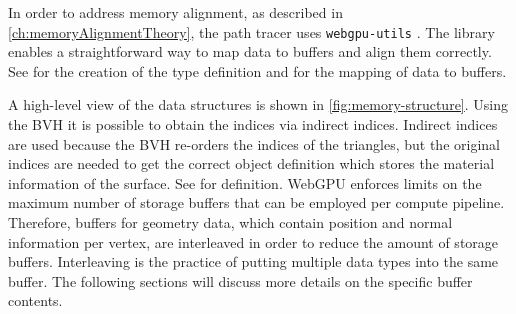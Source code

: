 In order to address memory alignment, as described in \autoref{ch:memoryAlignmentTheory}, the path tracer uses \texttt{webgpu-utils} \cite{webgpuUtilsLib}. The library enables a straightforward way to map data to buffers and align them correctly. See  for the creation of the type definition and  for the mapping of data to buffers.

A high-level view of the data structures is shown in \autoref{fig:memory-structure}. Using the \gls{BVH} it is possible to obtain the indices via indirect indices. Indirect indices are used because the \gls{BVH} re-orders the indices of the triangles, but the original indices are needed to get the correct object definition which stores the material information of the surface. See  for definition. \gls{WebGPU} enforces limits on the maximum number of storage buffers that can be employed per compute pipeline. Therefore, buffers for geometry data, which contain position and normal information per vertex, are interleaved in order to reduce the amount of storage buffers. Interleaving is the practice of putting multiple data types into the same buffer. The following sections will discuss more details on the specific buffer contents.

